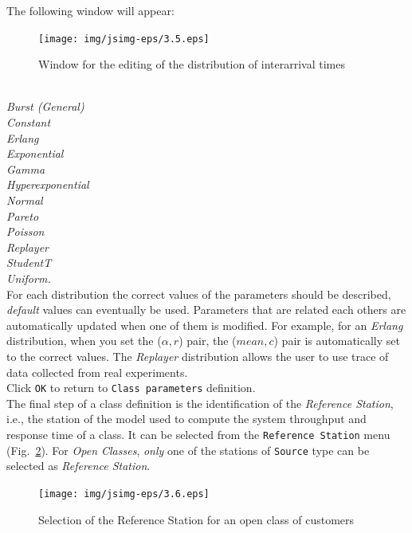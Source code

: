 The following window will appear:
\begin{figure}[htb!]
    \begin{center}
        \texttt{[image: img/jsimg-eps/3.5.eps]}
    \end{center}
    \caption{Window for the editing of the distribution of interarrival times}
    \label{fig:editdistrib}
\end{figure}

\\
\emph{Burst (General)\\
Constant\\
Erlang\\
Exponential\\
Gamma\\
Hyperexponential\\
Normal\\
Pareto\\
Poisson\\
Replayer\\
StudentT\\
Uniform.\\
} For each distribution the correct values of the
parameters should be described, \emph{default} values can eventually be
used. Parameters that are related each others are automatically
updated when one of them is modified. For example, for an
\emph{Erlang} distribution, when you set the ($\alpha, r$) pair, the
($mean, c$) pair is automatically set to the correct values. The
\emph{Replayer} distribution
allows the user to use trace of data collected from real experiments.\\
Click \texttt{OK} to return to \texttt{Class parameters} definition.\\
The final step of a class definition is the identification of the
\emph{Reference Station}, i.e., the station of the model used to
compute the system throughput and response time of a class. It can be
selected from
the \texttt{Reference
Station} menu (Fig.~\ref{fig:selrefstat}). For
\emph{Open Classes}, \emph{only} one of the stations of
\texttt{Source} type can be selected as \emph{Reference Station}.
\begin{figure}[htb!]
    \begin{center}
        \texttt{[image: img/jsimg-eps/3.6.eps]}
    \end{center}
    \caption{Selection of the Reference Station for an open class of customers}
    \label{fig:selrefstat}
\end{figure}\\

